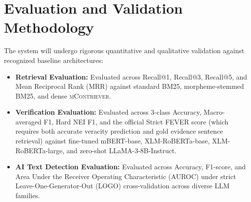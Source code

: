 \section{Evaluation and Validation Methodology}
\label{sec:evaluation}
The system will undergo rigorous quantitative and qualitative validation against recognized baseline architectures:
\begin{itemize}[leftmargin=*, nosep]
    \item \textbf{Retrieval Evaluation:} Evaluated across Recall@1, Recall@3, Recall@5, and Mean Reciprocal Rank (MRR) against standard BM25, morpheme-stemmed BM25, and dense \textsc{mContriever}.
    \item \textbf{Verification Evaluation:} Evaluated across 3-class Accuracy, Macro-averaged F1, Hard NEI F1, and the official Strict FEVER score (which requires both accurate veracity prediction and gold evidence sentence retrieval) against fine-tuned mBERT-base, XLM-RoBERTa-base, XLM-RoBERTa-large, and zero-shot LLaMA-3-8B-Instruct.
    \item \textbf{AI Text Detection Evaluation:} Evaluated across Accuracy, F1-score, and Area Under the Receiver Operating Characteristic (AUROC) under strict Leave-One-Generator-Out (LOGO) cross-validation across diverse LLM families.
\end{itemize}

